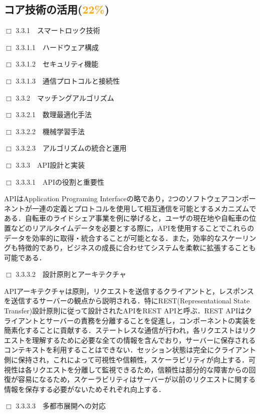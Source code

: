   \subsection{コア技術の活用(\textcolor{orange}{22\%})}
    \label{sec:コア技術の活用}
      \par $\Box$ 3.3.1　スマートロック技術
      \par $\Box$ 3.3.1.1　ハードウェア構成
      \par $\Box$ 3.3.1.2　セキュリティ機能
      \par $\Box$ 3.3.1.3　通信プロトコルと接続性
      \par $\Box$ 3.3.2　マッチングアルゴリズム
      \par $\Box$ 3.3.2.1　数理最適化手法
      \par $\Box$ 3.3.2.2　機械学習手法
      \par $\Box$ 3.3.2.3　アルゴリズムの統合と運用
      \par $\Box$ 3.3.3　API設計と実装
      \par $\Box$ 3.3.3.1　APIの役割と重要性
      \par APIはApplication Programing Interfaceの略であり，2つのソフトウェアコンポーネントが一連の定義とプロトコルを使用して相互通信を可能とするメカニズムである．自転車のライドシェア事業を例に挙げると，ユーザの現在地や自転車の位置などのリアルタイムデータを必要とする際に，APIを使用することでこれらのデータを効率的に取得・統合することが可能となる．また，効率的なスケーリングも特徴的であり，ビジネスの成長に合わせてシステムを柔軟に拡張することも可能である．
      \par $\Box$ 3.3.3.2　設計原則とアーキテクチャ
      \par APIアーキテクチャは原則，リクエストを送信するクライアントと，レスポンスを送信するサーバーの観点から説明される．特にREST(Representational State Transfer)設計原則に従って設計されたAPIをREST APIと呼ぶ．REST APIはクライアントとサーバーの責務を分離することを促進し，コンポーネントの実装を簡素化することに貢献する．ステートレスな通信が行われ，各リクエストはリクエストを理解するために必要な全ての情報を含んでおり，サーバーに保存されるコンテキストを利用することはできない．セッション状態は完全にクライアント側に保持され，これによって可視性や信頼性，スケーラビリティが向上する．可視性は各リクエストを分離して監視できるため，信頼性は部分的な障害からの回復が容易になるため，スケーラビリティはサーバーが以前のリクエストに関する情報を保存する必要がないためそれぞれ向上する．
      \par $\Box$ 3.3.3.3　多都市展開への対応
      

